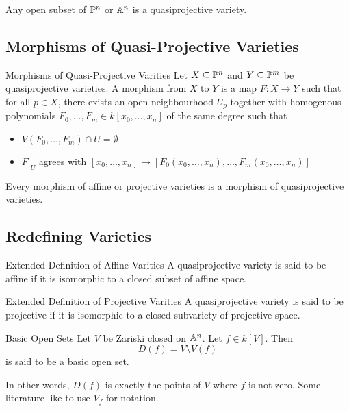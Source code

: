 \documentclass[a4paper]{article}
\begin{document}
\begin{lmm}{}{} Any open subset of $\mathbb{P}^n$ or $\mathbb{A}^n$ is a quasiprojective variety. 
\end{lmm}

\subsection{Morphisms of Quasi-Projective Varieties}
\begin{defn}{Morphisms of Quasi-Projective Varities}{} Let $X\subseteq\mathbb{P}^n$ and $Y\subseteq\mathbb{P}^m$ be quasiprojective varieties. A morphism from $X$ to $Y$  is a map $F:X\to Y$ such that for all $p\in X$, there exists an open neighbourhood $U_p$ together with homogenous polynomials $F_0,\dots,F_m\in k[x_0,\dots,x_n]$ of the same degree such that 
\begin{itemize}
\item $V(F_0,\dots,F_m)\cap U=\emptyset$
\item $F|_U$ agrees with $[x_0,\dots,x_n]\to[F_0(x_0,\dots,x_n),\dots,F_m(x_0,\dots,x_n)]$
\end{itemize}
\end{defn}

\begin{lmm}{}{} Every morphism of affine or projective varieties is a morphism of quasiprojective varieties. 
\end{lmm}

\subsection{Redefining Varieties}
\begin{defn}{Extended Definition of Affine Varities}{} A quasiprojective variety is said to be affine if it is isomorphic to a closed subset of affine space. 
\end{defn}

\begin{defn}{Extended Definition of Projective Varities}{} A quasiprojective variety is said to be projective if it is isomorphic to a closed subvariety of projective space. 
\end{defn}

\begin{defn}{Basic Open Sets}{} Let $V$ be Zariski closed on $\mathbb{A}^n$. Let $f\in k[V]$. Then $$D(f)=V\setminus V(f)$$ is said to be a basic open set. 
\end{defn}

In other words, $D(f)$ is exactly the points of $V$ where $f$ is not zero. Some literature like to use $V_f$ for notation. 
\end{document}
